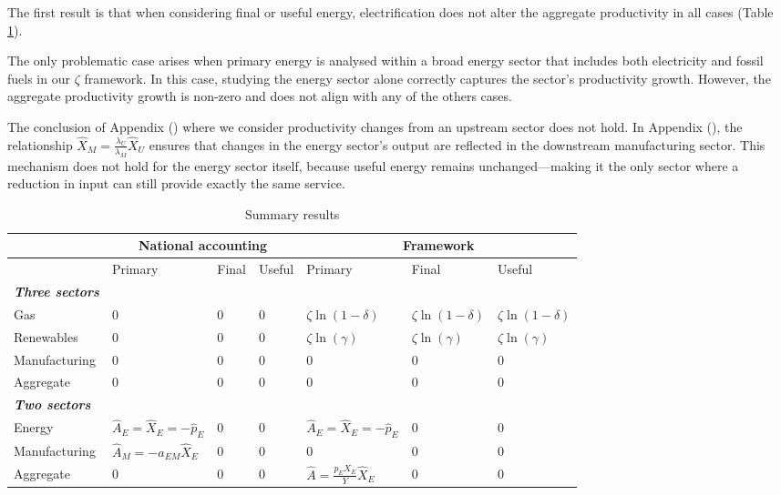 \documentclass[11pt]{article}
\begin{document}
The first result is that when considering final or useful energy, electrification does not alter the aggregate productivity in all cases (Table \ref{table_summary_results_energy}). 

The only problematic case arises when primary energy is analysed within a broad energy sector that includes both electricity and fossil fuels in our $\zeta$ framework. In this case, studying the energy sector alone correctly captures the sector's productivity growth. However, the aggregate productivity growth is non-zero and does not align with any of the others cases. 

The conclusion of Appendix () where we consider productivity changes from an upstream sector does not hold. In Appendix (), the relationship $\hat{X}_M = \frac{\lambda_U}{\lambda_M} \hat{X}_U$ ensures that changes in the energy sector’s output are reflected in the downstream manufacturing sector. This mechanism does not hold for the energy sector itself, because useful energy remains unchanged—making it the only sector where a reduction in input can still provide exactly the same service.

\begin{table}[H]
\centering
\begin{tabular}{llll|lll}
\toprule
              & \multicolumn{3}{c}{National accounting} & \multicolumn{3}{c}{Framework} \\ \midrule
              & Primary      & Final      & Useful     
              & Primary   & Final   & Useful  \\ 
\midrule
\textbf{\textit{Three sectors}} &              &            &             &           &         &         \\\midrule
Gas           & 0         & 0       &  0          
&   $\zeta \ln(1-\delta)$       &     $\zeta \ln(1-\delta)$      &    $\zeta \ln(1-\delta)$         \\
Renewables    & 0         & 0       &  0           
&      $\zeta \ln(\gamma)$       &       $\zeta \ln(\gamma)$     &   $\zeta \ln(\gamma)$        \\
Manufacturing & 0         & 0       &  0           
&     0     &  0        &     0    \\
Aggregate     & 0         & 0       &  0         
&    0      & 0         &   0      \\ 
 \midrule
\textbf{\textit{Two sectors}}   &              &            &             &           &         &         \\\midrule
Energy        &    $\hat{A}_E=\hat{X}_E=-\hat{p}_E$    & 0       &  0          
&       $\hat{A}_E=\hat{X}_E=-\hat{p}_E$    &   0      &   0      \\
Manufacturing &  $\hat{A}_M=-a_{EM}\hat{X}_E$         & 0       &  0         
&      0     &    0     &       0  \\
Aggregate    & 0         & 0       &  0         
&     $\hat{A}=\frac{p_EX_E}{Y}\hat{X}_E$      &   0      &  0  \\
\bottomrule
\end{tabular}
\caption{Summary results}
\label{table_summary_results_energy}
\end{table}
\end{document}

